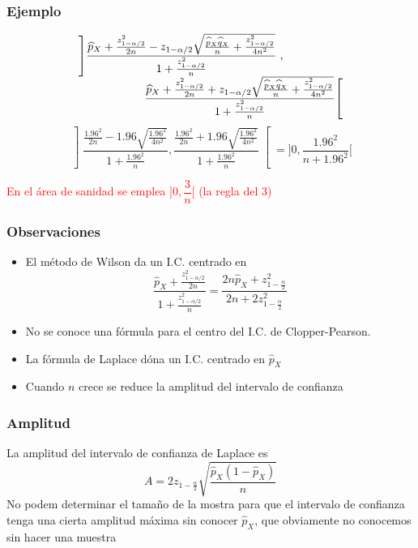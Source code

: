 \documentclass[12pt,t]{beamer}
\newcommand{\red}[1]{\textcolor{red}{#1}}
\theoremstyle{plain}
\theoremstyle{definition}
\begin{document}
\begin{frame}
\frametitle{Ejemplo}
\vspace*{-5ex}

{\small
$$
\begin{array}{l}
\displaystyle \left]\frac{\widehat{p}_{X}+\frac{z_{1-{\alpha}/{2}}^2}{2n}-z_{1-{\alpha}/{2}}\sqrt{\frac{\widehat{p}_{X}\widehat{q}_{X}}{n}+\frac{z_{1-{\alpha}/{2}}^2}{4n^2}}}{1+\frac{z_{1-{\alpha}/{2}}^2}{n}}\right.,\\[2ex]
\hspace*{2cm} \displaystyle \left.\frac{\widehat{p}_{X}+\frac{z_{1-{\alpha}/{2}}^2}{2n}+z_{1-{\alpha}/{2}}\sqrt{\frac{\widehat{p}_{X}\widehat{q}_{X}}{n}+\frac{z_{1-{\alpha}/{2}}^2}{4n^2}}}{1+\frac{z_{1-{\alpha}/{2}}^2}{n}}\right[
\end{array}
$$
$$
\left]\frac{\frac{1.96^2}{2n}- 1.96\sqrt{\frac{1.96^2}{4n^2}}}{1+\frac{1.96^2}{n}},
\frac{\frac{1.96^2}{2n}+ 1.96\sqrt{\frac{1.96^2}{4n^2}}}{1+\frac{1.96^2}{n}}\right[
=\Big]0,\frac{1.96^2}{n+1.96^2}\Big[
$$

}

\red{En el área de sanidad se emplea  $\Big]0,\dfrac{3}{n}\Big[$ (la regla del 3)}


\end{frame}


\begin{frame}
\frametitle{Observaciones }
\begin{itemize}
\item El método  de Wilson da un I.C. centrado   en
$$
\frac{\widehat{p}_{X}+\frac{z_{1-{\alpha}/{2}}^2}{2n}}{1+\frac{z_{1-{\alpha}/{2}}^2}{n}}
=\frac{2n\widehat{p}_{X}+ z_{1-\frac{\alpha}{2}}^2}{2n+2 z_{1-\frac{\alpha}{2}}^2}
$$

\item No se conoce una fórmula para el centro del I.C. de Clopper-Pearson.

\item La fórmula de Laplace dóna un I.C.  centrado   en $\widehat{p}_{X}$
\medskip

\item Cuando $n$ crece se reduce la amplitud del intervalo de confianza 

\end{itemize}

\end{frame}


\begin{frame}
\frametitle{Amplitud}

La amplitud del intervalo de confianza  de Laplace es 
$$
A=2 z_{1-\frac{\alpha}{2}} \sqrt{\frac{\widehat{p}_{X} (1-\widehat{p}_{X})}{n}}
$$
No podem determinar el   tamaño  de la mostra para que el intervalo de confianza  tenga una cierta amplitud máxima sin
conocer $\widehat{p}_{X}$, que obviamente no conocemos sin hacer una muestra

\end{frame}
\end{document}
